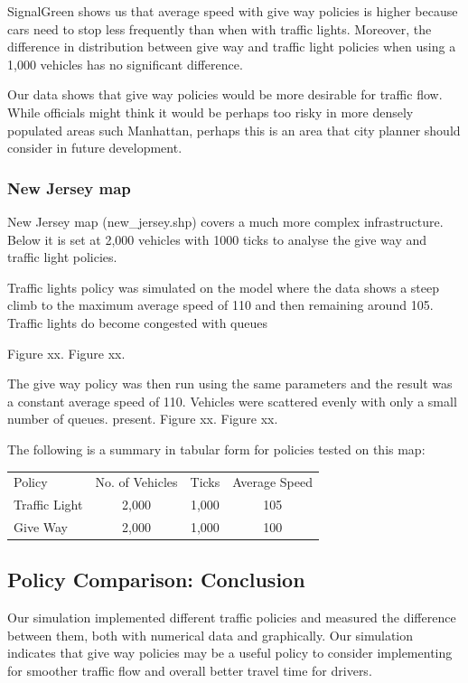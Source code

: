 \documentclass[11pt]{article}
\begin{document}
\begin{enumerate}
SignalGreen shows us that average speed with give way policies is higher because cars need to stop less frequently than when with traffic lights. Moreover, the difference in distribution between give way and traffic light policies when using a 1,000 vehicles has no significant difference.

Our data shows that give way policies would be more desirable for traffic flow. While officials might think it would be perhaps too risky in more densely populated areas such Manhattan, perhaps this is an area that city planner should consider in future development.

\subsubsection{New Jersey map}

New Jersey map (new\_jersey.shp)  covers a much more complex infrastructure. Below it is set at 2,000 vehicles with 1000 ticks to analyse the give way and traffic light policies.

Traffic lights policy was simulated on the model where the data shows a steep climb to the maximum average speed of 110 and then remaining around 105. Traffic lights do become congested with queues

Figure xx.
Figure xx.

The give way policy was then run using the same parameters and the result was a constant average speed of 110. Vehicles were scattered evenly with only a small number of queues. present.
Figure xx.
Figure xx.

The following is a summary in tabular form for policies tested on this map:
\begin{center}
\begin{tabular}{ l | c | c | c }
\hline
Policy & No. of Vehicles & Ticks & Average Speed \\
Traffic Light   & 2,000     &          1,000 &     105  \\
Give Way     &   2,000  &             1,000    &  100 \\
\hline
\end{tabular}
\end{center}

\subsection{Policy Comparison: Conclusion}

Our simulation implemented different traffic policies and measured the difference between them, both with numerical data and graphically. Our simulation indicates that give way policies may be a useful policy to consider implementing for smoother traffic flow and overall better travel time for drivers.


\end{enumerate}
\end{document}

